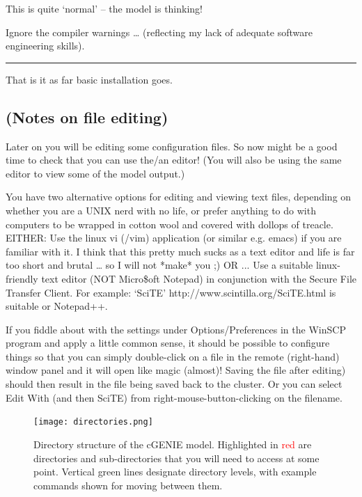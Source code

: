 \documentclass[11pt,fleqn]{book} %
\begin{document}
This is quite ‘normal’ – the model is thinking!

Ignore the compiler warnings … (reflecting my lack of adequate software engineering skills).

\hfill \break
\noindent\rule{4cm}{0.1mm}
\hfill \break

That is it as far basic installation goes.


\subsection{(Notes on file editing)}

Later on you will be editing some configuration files. So now might be a good time to check that you can use the/an editor! (You will also be using the same editor to view some of the model output.)

You have two alternative options for editing and viewing text files, depending on whether you are a UNIX nerd with no life, or prefer anything to do with computers to be wrapped in cotton wool and covered with dollops of treacle.
EITHER: Use the linux vi (/vim) application (or similar e.g. emacs) if you are familiar with it. I think that this pretty much sucks as a text editor and life is far too short and brutal … so I will not *make* you ;)
OR ... Use a suitable linux-friendly text editor (NOT Micro\$oft Notepad) in conjunction with the Secure File Transfer Client. For example: ‘SciTE’ http://www.scintilla.org/SciTE.html is suitable or Notepad++.

If you fiddle about with the settings under Options/Preferences in the WinSCP program and apply a little common sense, it should be possible to configure things so that you can simply double-click on a file in the remote (right-hand) window panel and it will open like magic (almost)! Saving the file after editing) should then result in the file being saved back to the cluster. Or you can select Edit With (and then SciTE) from right-mouse-button-clicking on the filename.


\begin{figure}
\texttt{[image: directories.png]}
\caption{Directory structure of the cGENIE model. Highlighted in \textcolor{red}{red} are directories and sub-directories that you will need to access at some point. Vertical \textcolor[rgb]{0,0.501961,0}{green} lines designate directory levels, with example commands shown for moving between them.}
\label{fig:directories}
\end{figure}
\end{document}
